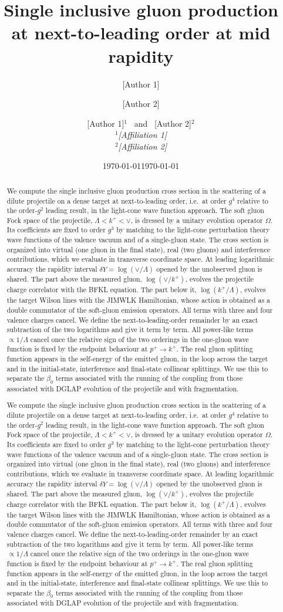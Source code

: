 \documentclass[aps,prd,onecolumn,superscriptaddress,nofootinbib,floatfix,longbibliography,11pt]{revtex4-2}
\numberwithin{equation}{section}
\begin{document}
\title{Single inclusive gluon production at next-to-leading order at mid rapidity}

\ifrevtex
  \author{[Author 1]}
  \affiliation{[Affiliation 1]}
  \author{[Author 2]}
  \affiliation{[Affiliation 2]}
  \date{\today}
\else
  \author{[Author 1]$^{1}$ \ and \ [Author 2]$^{2}$\\[4pt]
  {\small\itshape $^{1}$[Affiliation 1]}\\
  {\small\itshape $^{2}$[Affiliation 2]}}
  \date{\today}
\fi

\newcommand{\abstracttext}{%
We compute the single inclusive gluon production cross section in the scattering of a dilute projectile on a dense target at next-to-leading order, i.e.\ at order $g^4$ relative to the order-$g^2$ leading result, in the light-cone wave function approach. The soft gluon Fock space of the projectile, $\Lambda<k^+<\vee$, is dressed by a unitary evolution operator $\Omega$. Its coefficients are fixed to order $g^3$ by matching to the light-cone perturbation theory wave functions of the valence vacuum and of a single-gluon state. The cross section is organized into virtual (one gluon in the final state), real (two gluons) and interference contributions, which we evaluate in transverse coordinate space. At leading logarithmic accuracy the rapidity interval $\delta Y=\log(\vee/\Lambda)$ opened by the unobserved gluon is shared. The part above the measured gluon, $\log(\vee/k^+)$, evolves the projectile charge correlator with the BFKL equation. The part below it, $\log(k^+/\Lambda)$, evolves the target Wilson lines with the JIMWLK Hamiltonian, whose action is obtained as a double commutator of the soft-gluon emission operators. All terms with three and four valence charges cancel. We define the next-to-leading-order remainder by an exact subtraction of the two logarithms and give it term by term. All power-like terms $\propto 1/\Lambda$ cancel once the relative sign of the two orderings in the one-gluon wave function is fixed by the endpoint behaviour at $p^+\to k^+$. The real gluon splitting function appears in the self-energy of the emitted gluon, in the loop across the target and in the initial-state, interference and final-state collinear splittings. We use this to separate the $\beta_0$ terms associated with the running of the coupling from those associated with DGLAP evolution of the projectile and with fragmentation.}

\ifrevtex
  \begin{abstract}\abstracttext\end{abstract}
  \maketitle
\else
  \maketitle
  \begin{abstract}\abstracttext\end{abstract}
\fi
\end{document}

